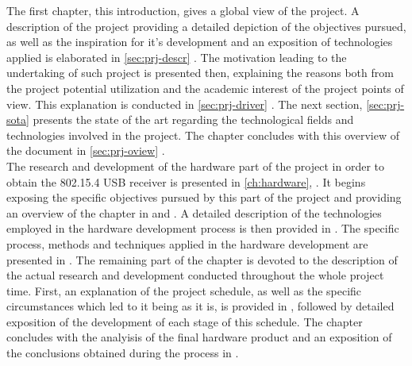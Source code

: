		The first chapter, this introduction, gives a global view of the project. A description of the project providing a detailed depiction of the objectives pursued, as well as the inspiration for it's development and an exposition of technologies applied is elaborated in \autoref{sec:prj-descr} \emph{}. The motivation leading to the undertaking of such project is presented then, explaining the reasons both from the project potential utilization and the academic interest of the project points of view. This explanation is conducted in \autoref{sec:prj-driver} \emph{}. The next section, \autoref{sec:prj-sota} presents the state of the art regarding the technological fields and technologies involved in the project. The chapter concludes with this overview of the document in \autoref{sec:prj-oview} \emph{}.\\
		
		The research and development of the hardware part of the project in order to obtain the 802.15.4 USB receiver is presented in \autoref{ch:hardware}, \emph{}. It begins exposing the specific objectives pursued by this part of the project and providing an overview of the chapter in  and . A detailed description of the technologies employed in the hardware development process is then provided in . The specific process, methods and techniques applied in the hardware development are presented in . The remaining part of the chapter is devoted to the description of the actual research and development conducted throughout the whole project time. First, an explanation of the project schedule, as well as the specific circumstances which led to it being as it is, is provided in , followed by detailed exposition of the development of each stage of this schedule. The chapter concludes with the analyisis of the final hardware product and an exposition of the conclusions obtained during the process in .\\

